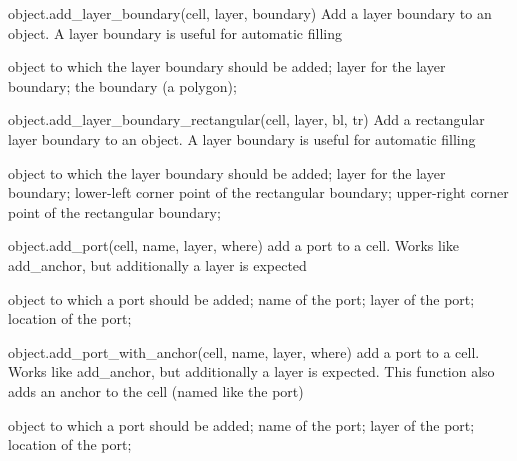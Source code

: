\begin{APIfunc}{object.add\_layer\_boundary(cell, layer, boundary)}
    Add a layer boundary to an object. A layer boundary is useful for automatic filling
    \begin{APIparameters}
            object to which the layer boundary should be added;
            layer for the layer boundary;
            the boundary (a polygon);
    \end{APIparameters}
\end{APIfunc}
\begin{APIfunc}{object.add\_layer\_boundary\_rectangular(cell, layer, bl, tr)}
    Add a rectangular layer boundary to an object. A layer boundary is useful for automatic filling
    \begin{APIparameters}
            object to which the layer boundary should be added;
            layer for the layer boundary;
            lower-left corner point of the rectangular boundary;
            upper-right corner point of the rectangular boundary;
    \end{APIparameters}
\end{APIfunc}
\begin{APIfunc}{object.add\_port(cell, name, layer, where)}
    add a port to a cell. Works like add\_anchor, but additionally a layer is expected
    \begin{APIparameters}
            object to which a port should be added;
            name of the port;
            layer of the port;
            location of the port;
    \end{APIparameters}
\end{APIfunc}
\begin{APIfunc}{object.add\_port\_with\_anchor(cell, name, layer, where)}
    add a port to a cell. Works like add\_anchor, but additionally a layer is expected. This function also adds an anchor to the cell (named like the port)
    \begin{APIparameters}
            object to which a port should be added;
            name of the port;
            layer of the port;
            location of the port;
    \end{APIparameters}
\end{APIfunc}
